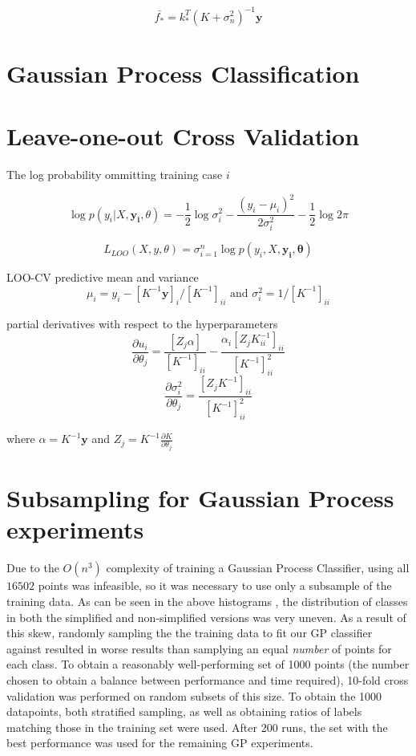 $$\bar{f_*} = k_*^T(K+\sigma_n^2)^{-1} \mathbf{y}$$

\section{Gaussian Process Classification}

\section{Leave-one-out Cross Validation}

The log probability ommitting training case $i$

$$\log p(y_i|X, \mathbf{y_i}, \theta) = -\frac{1}{2}\log\sigma^2_i - \frac{(y_i - \mu_i)^2}{2 \sigma^2_i} - \frac{1}{2}\log2\pi$$

$$ L_{LOO}(X, y, \theta) = \sigma^n_{i=1} \log p(y_i, X, \mathbf{y_i}, \mathbf{\theta})$$

LOO-CV predictive mean and variance
$$\mu_i= y_i - [K^{-1}\mathbf{y}]_i / [K^{-1}]_{ii} \text{ and } \sigma_i^2 = 1/[K^{-1}]_{ii}$$

partial derivatives with respect to the hyperparameters
$$\frac{\partial{u_i}}{\partial{\theta_j}} = \frac{[Z_j \alpha]}{[K^{-1}]_{ii}} - \frac{\alpha_i[Z_j K^{-1}_{ii}]_{ii}}{[K^{-1}]^2_{ii}}$$
$$\frac{\partial{\sigma_i^2}}{\partial{\theta_j}} = \frac{[Z_jK^{-1}]_{ii}}{[K^{-1}]^2_{ii}}$$

where $\alpha = K^{-1}\mathbf{y}$ and $Z_j = K^{-1} \frac{\partial{K}}{\partial{\theta_j}}$

\section{Subsampling for Gaussian Process experiments}

Due to the $O(n^3)$ complexity of training a Gaussian Process Classifier, using all $16502$ points was infeasible, so it was necessary to use only a subsample of the training data. As can be seen in the above histograms , the distribution of classes in both the simplified and non-simplified versions was very uneven. As a result of this skew, randomly sampling the the training data to fit our GP classifier against resulted in worse results than samplying an equal \textit{number} of points for each class. To obtain a reasonably well-performing set of 1000 points (the number chosen to obtain a balance between performance and time required), 10-fold cross validation was performed on random subsets of this size. To obtain the 1000 datapoints, both stratified sampling, as well as obtaining ratios of labels matching those in the training set were used. After 200 runs, the set with the best performance was used for the remaining GP experiments.

